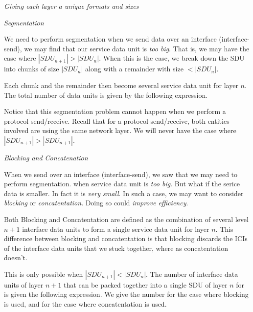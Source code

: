 \frmrule 

\textit{Giving each layer a unique formats and sizes}



\frmrule 


\textit{Segmentation}

We need to perform segmentation when we send data over an interface
(interface-send), we may find that our service data unit is \textit{too big}. 
That is, we may have the case where $|SDU_{n+1}| > |SDU_{n}|$. 
When this is the case, we break down the SDU into chunks of size $|SDU_{n}|$ 
along with a remainder with size $< |SDU_{n}|$. 


Each chunk and the remainder then become several service data unit for layer $n$.
The total number of data units is given by the following expression.

Notice that this segmentation problem cannot happen when we perform a protocol 
send/receive. Recall that for a protocol send/receive, both entities involved are 
using the same network layer. We will never have the case where 
$|SDU_{n+1}| > |SDU_{n+1}|$.

\frmrule

\textit{Blocking and Concatenation}

When we send over an interface
(interface-send), we saw that we may need to perform segmentation. 
when service data unit is \textit{too big}. But what if the serice data 
is smaller. In fact it is \textit{very small}. In such a case, we may want to consider 
\textit{blocking} or \textit{concatentation}. Doing so could \textit{improve efficiency}.

Both Blocking and Concatentation are defined as the combination of 
several level $n+1$ interface data units to form a single 
service data unit for layer $n$. This difference between 
blocking and concatentation is that blocking discards the ICIs of 
the interface data units that we stuck together, where as 
concatentation doesn't. 

This is only possible when
$|SDU_{n+1}| < |SDU_{n}|$.
The number of interface data units of layer $n+1$ that can be packed together into a single SDU of layer $n$
for is given the following expression. 
We give the number for the case where blocking is used, and 
for the case where concatentation is used. 



